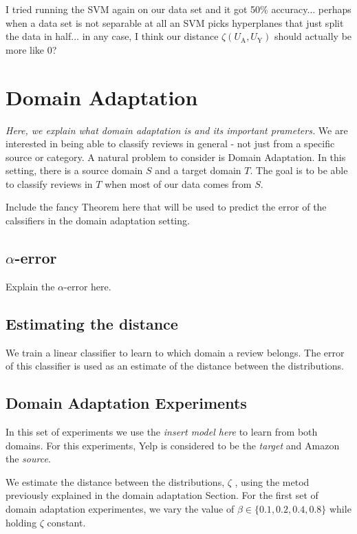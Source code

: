 \documentclass[letterpaper]{article}
\begin{document}
I tried running the SVM again on our data set and it got 50\% accuracy... perhaps when a data set is not separable at all an SVM picks hyperplanes that just split the data in half... in any case, I think our distance $\zeta(U_{\textrm{A}}, U_{\textrm{Y}})$ should actually be more like 0?

\section{Domain Adaptation}
\label{sec:background}

\emph{Here, we explain what domain adaptation is and its important
prameters.}
We are interested in being able to classify reviews in general - not
just from a specific source or category. A natural problem to consider
is Domain Adaptation. In this setting, there is a source domain $S$
and a target domain $T$. The goal is to be able to classify reviews in
$T$ when most of our data comes from $S$. 

Include the fancy Theorem here that will be used to predict the error
of the calssifiers in the domain adaptation setting.

\subsection{$\alpha$-error}
\label{sec:alpha-error}

Explain the $\alpha$-error here.

\subsection{Estimating the distance}
\label{sec:estimating-distance}

We train a linear classifier to learn to which domain a review
belongs. The error of this classifier is used as an estimate of the
distance between the distributions.


\subsection{Domain Adaptation Experiments}
\label{sec:domain-adaptation}

In this set of experiments we use the \emph{insert model here} to
learn from both domains. For this experiments, Yelp is considered to be
the \emph{target} and Amazon the \emph{source}.

We estimate the distance between the distributions, $\zeta$ , using the metod
previously explained in the domain adaptation Section. For the first
set of domain adaptation experimentes, we vary the value of $\beta \in
\{0.1, 0.2, 0.4, 0.8\}$ while holding $\zeta$ constant.
\end{document}
